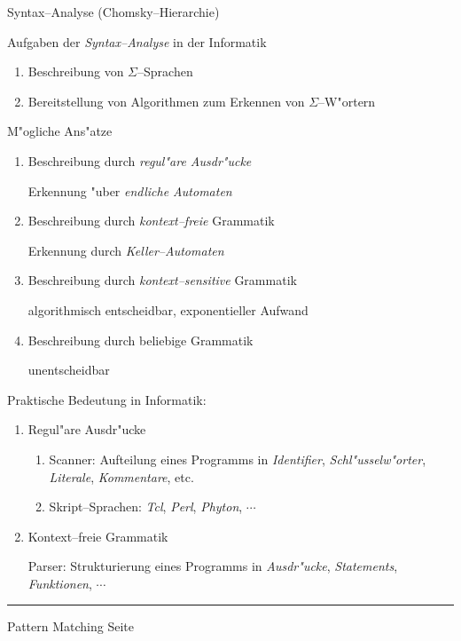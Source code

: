 
\begin{slide}{}
\normalsize

\begin{center}
Syntax--Analyse (Chomsky--Hierarchie)
\end{center}
\vspace*{0.5cm}

\footnotesize
Aufgaben der \emph{Syntax--Analyse} in der Informatik
\begin{enumerate}
\item Beschreibung von $\Sigma$--Sprachen
\item Bereitstellung von Algorithmen zum Erkennen von $\Sigma$--W"ortern
\end{enumerate}

M"ogliche Ans"atze
\begin{enumerate}
\item Beschreibung durch \emph{regul"are Ausdr"ucke}

      Erkennung "uber \emph{endliche Automaten}
\item Beschreibung durch \emph{kontext--freie} Grammatik

      Erkennung durch \emph{Keller--Automaten}
\item Beschreibung durch \emph{kontext--sensitive} Grammatik

      algorithmisch entscheidbar, exponentieller Aufwand
\item Beschreibung durch beliebige Grammatik

      unentscheidbar
\end{enumerate}
Praktische Bedeutung in Informatik:
\begin{enumerate}
\item Regul"are Ausdr"ucke
  \begin{enumerate}
  \item Scanner: Aufteilung eines Programms in \emph{Identifier}, \emph{Schl"usselw"orter},
        \emph{Literale}, \emph{Kommentare}, etc.
  \item Skript--Sprachen: \textsl{Tcl}, \textsl{Perl}, \textsl{Phyton}, $\cdots$
  \end{enumerate}
\item Kontext--freie Grammatik

      Parser: Strukturierung eines Programms in \emph{Ausdr"ucke}, \emph{Statements}, \emph{Funktionen}, $\cdots$
\end{enumerate}

\vspace*{\fill}
\tiny \addtocounter{mypage}{1}
\rule{17cm}{1mm}
Pattern Matching \hspace*{\fill} Seite 
\end{slide}

